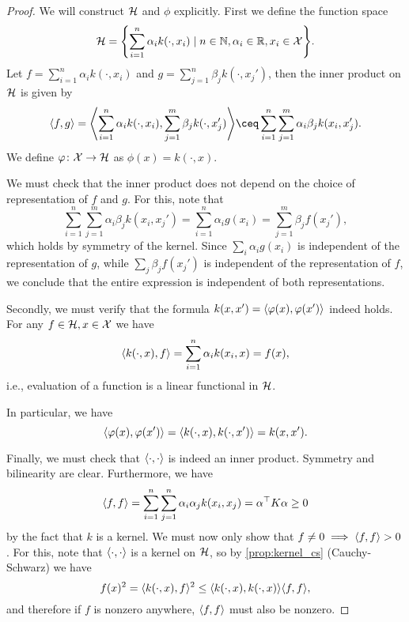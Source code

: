 \begin{proof}
    We will construct $\mathcal H$ and $\phi$ explicitly. First we define the function space
    \[
    \mathcal H = \qty{ \sum_{i=1}^n \alpha_i k(\cdot, x_i) \mid n \in \mathbb N,  \alpha_i \in \mathbb R, x_i \in \mathcal X}. 
    \]
    Let $f = \sum_{i=1}^n \alpha_i k(\cdot, x_i)$ and $g = \sum_{j=1}^n \beta_j k(\cdot, x_j')$, then the inner product on $\mathcal H$ is given by
    \[
    \ang{f, g} = \ang*{\sum_{i=1}^n \alpha_i k(\cdot, x_i), \sum_{j=1}^m \beta_j k(\cdot, x_j')} \ceq \sum_{i=1}^n \sum_{j=1}^m \alpha_i \beta_j k(x_i, x_j'). 
    \]
    We define $\varphi \colon \mathcal X \to \mathcal H$ as $\phi(x) = k(\cdot, x)$. 
    
    We must check that the inner product does not depend on the choice of representation of $f$ and $g$. For this, note that 
    \[
    \sum_{i=1}^n \sum_{j=1}^m \alpha_i\beta_j k(x_i, x_j') = \sum_{i=1}^n \alpha_i g(x_i) = \sum_{j=1}^m \beta_j f(x_j'),
    \]
    which holds by symmetry of the kernel. Since $\sum_i \alpha_i g(x_i)$ is independent of the representation of $g$, while $\sum_j \beta_j f(x_j')$ is independent of the representation of $f$, we conclude that the entire expression is independent of both representations. 
    
    Secondly, we must verify that the formula $k(x, x') = \langle\varphi(x), \varphi(x')\rangle$ indeed holds. For any $f \in \mathcal H, x \in \mathcal X$ we have
    \begin{equation}
    \langle k(\cdot, x), f\rangle = \sum_{i=1}^n \alpha_i k(x_i, x) = f(x),
    \end{equation}
    i.e., evaluation of a function is a linear functional in $\mathcal H$. 
    
    In particular, we have 
    \[
    \langle\varphi(x), \varphi(x')\rangle = \langle k(\cdot, x), k(\cdot, x')\rangle =  k(x, x'). 
    \]
    
    Finally, we must check that $\langle\cdot, \cdot\rangle$ is indeed an inner product. Symmetry and bilinearity are clear. Furthermore, we have
    \[
   \langle f, f\rangle = \sum_{i=1}^n \sum_{j=1}^n \alpha_i \alpha_j k(x_i, x_j) = \alpha^\top K\alpha \geq 0
    \]
    by the fact that $k$ is a kernel. We must now only show that $f \neq 0 \implies \langle f, f\rangle > 0$. For this, note that $\langle\cdot, \cdot\rangle$ is a kernel on $\mathcal H$, so by \cref{prop:kernel_cs} (Cauchy-Schwarz) we have
    \[
    f(x)^2 = \langle k(\cdot, x), f\rangle^2 \leq \langle k(\cdot, x), k(\cdot, x)\rangle \langle f, f\rangle, 
    \]
    and therefore if $f$ is nonzero anywhere, $\langle f, f\rangle$ must also be nonzero. 
\end{proof}

